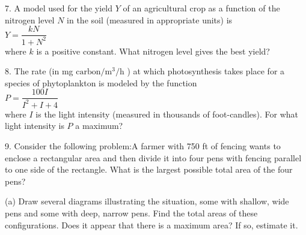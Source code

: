 \documentclass{sebase}
\begin{document}
\begin{multicols}{2}
\begin{ExerciseList}
%

\item[\hfill 7.] A model used for the yield $Y$ of an agricultural crop as a
function of the nitrogen level $N$ in the soil (measured in appropriate
units) is\\[6pt]
\hspace*{\fill}$Y=\dfrac{kN}{1+N^{2}}$\hspace*{\fill}\\[6pt]
where $k$ is a positive constant. What nitrogen level gives the best yield?

%

%

\item[\hfill 8.] The rate (in mg $\mathrm{carbon}/\mathrm{m}^{3}/\mathrm{h}$%
) at which photosynthesis takes place for a species of phytoplankton is
modeled by the function\\[6pt]
\hspace*{\fill}$P=\dfrac{100I}{I^{2}+I+4}$\hspace*{\fill}\\[6pt]
where $I$ is the light intensity (measured in thousands of foot-candles).
For what light intensity is $P$ a maximum?

%

\item[\hfill 9.] Consider the following problem:\hspace{6pt}A farmer with
750 ft of fencing wants to enclose a rectangular area and then divide it
into four pens with fencing parallel to one side of the rectangle. What is
the largest possible total area of the four pens?

\begin{ExerciseList}
\item[(a)] Draw several diagrams illustrating the situation, some with
shallow, wide pens and some with deep, narrow pens. Find the total areas of
these configurations. Does it appear that there is a maximum area? If so,
estimate it.


\end{ExerciseList}
\end{ExerciseList}
\end{multicols}
\end{document}
